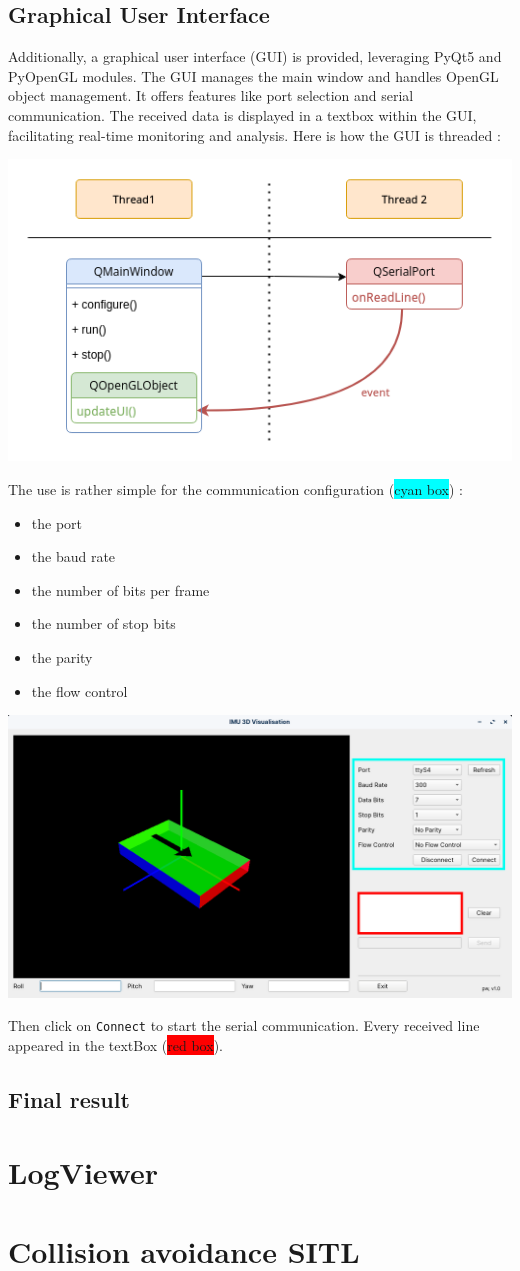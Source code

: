 \subsection{Graphical User Interface}
Additionally, a graphical user interface (GUI) is provided, leveraging PyQt5 and PyOpenGL modules. The GUI manages the main window and handles OpenGL object management. It offers features like port selection and serial communication. The received data is displayed in a textbox within the GUI, facilitating real-time monitoring and analysis.
Here is how the GUI is threaded :
\begin{center}
    \includegraphics[width=0.65\linewidth]{./projects/pmodnav/gui_threads.png}
\end{center}
The use is rather simple for the communication configuration (\colorbox{cyan}{cyan box}) :
\begin{itemize}
    \item the port
    \item the baud rate
    \item the number of bits per frame
    \item the number of stop bits
    \item the parity
    \item the flow control
\end{itemize}
\begin{center}
    \includegraphics[width=0.65\linewidth]{./projects/pmodnav/gui_window.png}
\end{center}
Then click on \texttt{Connect} to start the serial communication. Every received line appeared in the textBox (\colorbox{red}{red box}).

\subsection{Final result}

\section{LogViewer}

\section{Collision avoidance SITL}

